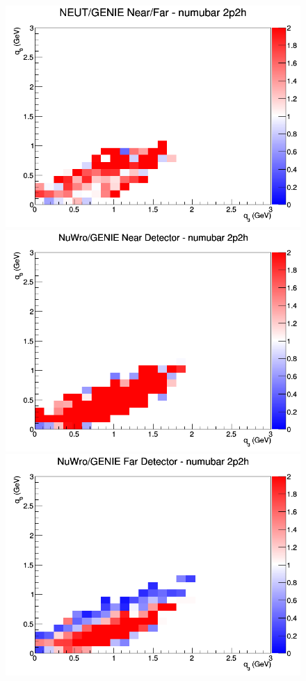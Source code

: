 \documentclass[12pt]{article}
\begin{document}
\begin{figure}[h]
\endminipage
{}
\includegraphics[width=\linewidth]{eff_q0_q3/FGT/ratios/2p2h_NEUT_GENIE_numubar_NF_q3_q0.png}
\endminipage
\newline
{}
\includegraphics[width=\linewidth]{eff_q0_q3/FGT/ratios/2p2h_NuWro_GENIE_numubar_near_q3_q0.png}
\endminipage
{}
\includegraphics[width=\linewidth]{eff_q0_q3/FGT/ratios/2p2h_NuWro_GENIE_numubar_far_q3_q0.png}

\end{figure}
\end{document}
